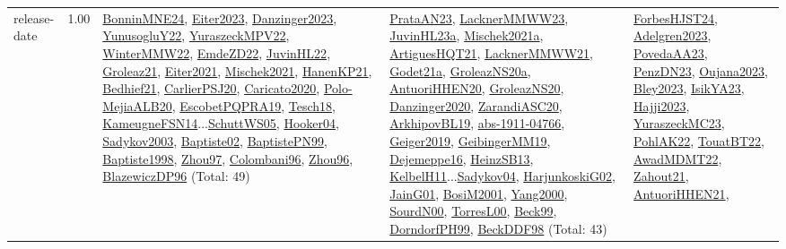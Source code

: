 {\begin{longtable}{p{3cm}r>{\raggedright\arraybackslash}p{6cm}>{\raggedright\arraybackslash}p{6cm}>{\raggedright\arraybackslash}p{8cm}}
\index{release-date}\index{Concepts!release-date}release-date &  1.00 & \hyperref[detail:BonninMNE24]{BonninMNE24}, \hyperref[detail:Eiter2023]{Eiter2023}, \hyperref[detail:Danzinger2023]{Danzinger2023}, \hyperref[detail:YunusogluY22]{YunusogluY22}, \hyperref[detail:YuraszeckMPV22]{YuraszeckMPV22}, \hyperref[detail:WinterMMW22]{WinterMMW22}, \hyperref[detail:EmdeZD22]{EmdeZD22}, \hyperref[detail:JuvinHL22]{JuvinHL22}, \hyperref[detail:Groleaz21]{Groleaz21}, \hyperref[detail:Eiter2021]{Eiter2021}, \hyperref[detail:Mischek2021]{Mischek2021}, \hyperref[detail:HanenKP21]{HanenKP21}, \hyperref[detail:Bedhief21]{Bedhief21}, \hyperref[detail:CarlierPSJ20]{CarlierPSJ20}, \hyperref[detail:Caricato2020]{Caricato2020}, \hyperref[detail:Polo-MejiaALB20]{Polo-MejiaALB20}, \hyperref[detail:EscobetPQPRA19]{EscobetPQPRA19}, \hyperref[detail:Tesch18]{Tesch18}, \hyperref[detail:KameugneFSN14]{KameugneFSN14}...\hyperref[detail:SchuttWS05]{SchuttWS05}, \hyperref[detail:Hooker04]{Hooker04}, \hyperref[detail:Sadykov2003]{Sadykov2003}, \hyperref[detail:Baptiste02]{Baptiste02}, \hyperref[detail:BaptistePN99]{BaptistePN99}, \hyperref[detail:Baptiste1998]{Baptiste1998}, \hyperref[detail:Zhou97]{Zhou97}, \hyperref[detail:Colombani96]{Colombani96}, \hyperref[detail:Zhou96]{Zhou96}, \hyperref[detail:BlazewiczDP96]{BlazewiczDP96} (Total: 49) & \hyperref[detail:PrataAN23]{PrataAN23}, \hyperref[detail:LacknerMMWW23]{LacknerMMWW23}, \hyperref[detail:JuvinHL23a]{JuvinHL23a}, \hyperref[detail:Mischek2021a]{Mischek2021a}, \hyperref[detail:ArtiguesHQT21]{ArtiguesHQT21}, \hyperref[detail:LacknerMMWW21]{LacknerMMWW21}, \hyperref[detail:Godet21a]{Godet21a}, \hyperref[detail:GroleazNS20a]{GroleazNS20a}, \hyperref[detail:AntuoriHHEN20]{AntuoriHHEN20}, \hyperref[detail:GroleazNS20]{GroleazNS20}, \hyperref[detail:Danzinger2020]{Danzinger2020}, \hyperref[detail:ZarandiASC20]{ZarandiASC20}, \hyperref[detail:ArkhipovBL19]{ArkhipovBL19}, \hyperref[detail:abs-1911-04766]{abs-1911-04766}, \hyperref[detail:Geiger2019]{Geiger2019}, \hyperref[detail:GeibingerMM19]{GeibingerMM19}, \hyperref[detail:Dejemeppe16]{Dejemeppe16}, \hyperref[detail:HeinzSB13]{HeinzSB13}, \hyperref[detail:KelbelH11]{KelbelH11}...\hyperref[detail:Sadykov04]{Sadykov04}, \hyperref[detail:HarjunkoskiG02]{HarjunkoskiG02}, \hyperref[detail:JainG01]{JainG01}, \hyperref[detail:BosiM2001]{BosiM2001}, \hyperref[detail:Yang2000]{Yang2000}, \hyperref[detail:SourdN00]{SourdN00}, \hyperref[detail:TorresL00]{TorresL00}, \hyperref[detail:Beck99]{Beck99}, \hyperref[detail:DorndorfPH99]{DorndorfPH99}, \hyperref[detail:BeckDDF98]{BeckDDF98} (Total: 43) & \hyperref[detail:ForbesHJST24]{ForbesHJST24}, \hyperref[detail:Adelgren2023]{Adelgren2023}, \hyperref[detail:PovedaAA23]{PovedaAA23}, \hyperref[detail:PenzDN23]{PenzDN23}, \hyperref[detail:Oujana2023]{Oujana2023}, \hyperref[detail:Bley2023]{Bley2023}, \hyperref[detail:IsikYA23]{IsikYA23}, \hyperref[detail:Hajji2023]{Hajji2023}, \hyperref[detail:YuraszeckMC23]{YuraszeckMC23}, \hyperref[detail:PohlAK22]{PohlAK22}, \hyperref[detail:TouatBT22]{TouatBT22}, \hyperref[detail:AwadMDMT22]{AwadMDMT22}, \hyperref[detail:Zahout21]{Zahout21}, \hyperref[detail:AntuoriHHEN21]{AntuoriHHEN21}, 
\end{longtable}}
